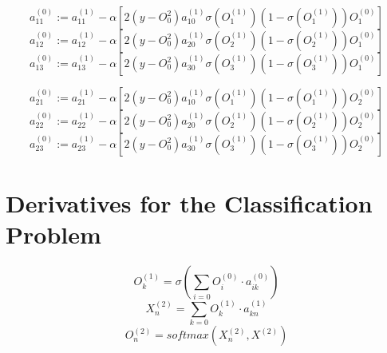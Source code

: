 \documentclass[12pt,a4paper, margin=1in]{article}
\begin{document}
\bigskip

\begin{equation*}
    a^{(0)}_{11} := a^{(1)}_{11} - \alpha \left [ 2(y - O^{2}_0)a^{(1)}_{10} \sigma(O^{(1)}_1)(1-\sigma(O^{(1)}_1)) O^{(0)}_1\right ]
\end{equation*}
\begin{equation*}
    a^{(0)}_{12} := a^{(1)}_{12} - \alpha \left [ 2(y - O^{2}_0)a^{(1)}_{20} \sigma(O^{(1)}_2)(1-\sigma(O^{(1)}_2)) O^{(0)}_1\right ]
\end{equation*}
\begin{equation*}
    a^{(0)}_{13} := a^{(1)}_{13} - \alpha \left [ 2(y - O^{2}_0)a^{(1)}_{30} \sigma(O^{(1)}_3)(1-\sigma(O^{(1)}_3)) O^{(0)}_1\right ]
\end{equation*}

\bigskip

\begin{equation*}
    a^{(0)}_{21} := a^{(1)}_{21} - \alpha \left [ 2(y - O^{2}_0)a^{(1)}_{10} \sigma(O^{(1)}_1)(1-\sigma(O^{(1)}_1)) O^{(0)}_2\right ]
\end{equation*}
\begin{equation*}
    a^{(0)}_{22} := a^{(1)}_{22} - \alpha \left [ 2(y - O^{2}_0)a^{(1)}_{20} \sigma(O^{(1)}_2)(1-\sigma(O^{(1)}_2)) O^{(0)}_2\right ]
\end{equation*}
\begin{equation*}
    a^{(0)}_{23} := a^{(1)}_{23} - \alpha \left [ 2(y - O^{2}_0)a^{(1)}_{30} \sigma(O^{(1)}_3)(1-\sigma(O^{(1)}_3)) O^{(0)}_2\right ]
\end{equation*}

\bigskip \bigskip

\section*{Derivatives for the Classification Problem}

\begin{equation}
    O^{(1)}_k = \sigma{ \left ( \sum_{i=0}^{} O^{(0)}_i \cdot a^{(0)}_{ik} \right ) } 
\end{equation}
\begin{equation}
    X^{(2)}_n = \sum_{k=0}^{} O^{(1)}_k \cdot a^{(1)}_{kn}  
\end{equation}
\begin{equation}
    O^{(2)}_n = softmax( X^{(2)}_n,  X^{(2)})
\end{equation}

\bigskip
\end{document}
